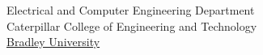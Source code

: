 \documentclass{article}
\def\dept{Electrical and Computer Engineering Department}
\def\college{Caterpillar College of Engineering and Technology}
\def\uname{Bradley University}
\begin{document}
\begin{center}
\vspace*{2.0cm}
\dept\\
\college\\
\href{http://www.bradley.edu/}{\uname}
\end{center}
\thispagestyle{empty}
\newpage


%
\pagestyle{fancy}
 \renewcommand{\contentsname}{Table of Contents}
 \tableofcontents %
 


 
 



\end{document}
